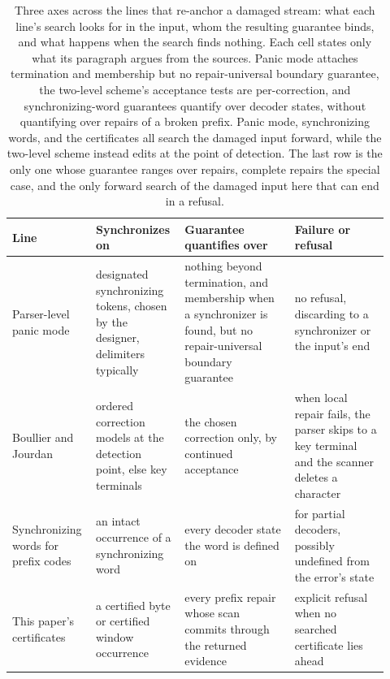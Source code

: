 \documentclass[11pt,a4paper]{article}
\theoremstyle{definition}
\theoremstyle{plain}
\theoremstyle{remark}
\begin{document}
\begin{table}[!htbp]
\centering
\small
\renewcommand{\arraystretch}{1.4}
\begin{tabular}{@{}>{\raggedright\arraybackslash}p{0.17\linewidth}p{0.22\linewidth}p{0.29\linewidth}p{0.24\linewidth}@{}}
\toprule
Line & Synchronizes on & Guarantee quantifies over & Failure or refusal \\
\midrule
Parser-level panic mode & designated synchronizing tokens, chosen by the designer, delimiters typically & nothing beyond
termination, and membership when a synchronizer is found, but no repair-universal boundary guarantee &
no refusal, discarding to a synchronizer or the input's end \\
\addlinespace[2.5pt]
Boullier and Jourdan & ordered correction models at the detection point, else key terminals & the chosen correction
only, by continued acceptance & when local repair fails, the parser skips to a key terminal and the scanner deletes a
character \\
\addlinespace[2.5pt]
Synchronizing words for prefix codes & an intact occurrence of a synchronizing word & every decoder state
the word is defined on & for partial decoders, possibly undefined from the error's state \\
\addlinespace[2.5pt]
This paper's certificates & a certified byte or certified window occurrence & every prefix repair whose
scan commits through the returned evidence & explicit refusal when no searched certificate lies ahead \\
\bottomrule
\end{tabular}
\renewcommand{\arraystretch}{1.0}
\caption{Three axes across the lines that re-anchor a damaged stream: what each line's search looks for in the input,
whom the resulting guarantee binds, and what happens when the search finds nothing. Each cell states only what its
paragraph argues from the sources. Panic mode attaches termination and membership but no repair-universal boundary
guarantee, the two-level scheme's acceptance tests are per-correction, and synchronizing-word guarantees quantify over
decoder states, without quantifying over repairs of a broken prefix. Panic mode, synchronizing words, and the
certificates all search the damaged input forward, while the two-level scheme instead edits at the point of detection.
The last row is the only one whose guarantee ranges over repairs, complete repairs the special case, and the only
forward search of the damaged input here that can end in a refusal.}
\label{tab:axes}
\end{table}
\end{document}
